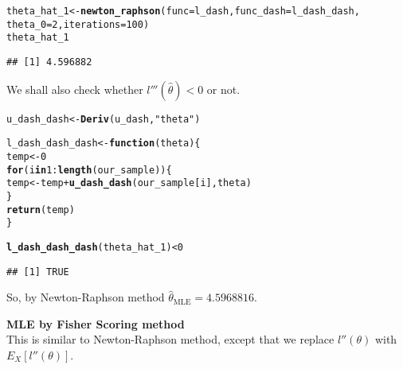 \documentclass[11pt, a4paper]{article}\usepackage[]{graphicx}\usepackage[]{xcolor}
\makeatletter
\newcommand{\hlnum}[1]{\textcolor[rgb]{0.686,0.059,0.569}{#1}}%
\newcommand{\hlsng}[1]{\textcolor[rgb]{0.192,0.494,0.8}{#1}}%
\newcommand{\hlopt}[1]{\textcolor[rgb]{0,0,0}{#1}}%
\newcommand{\hldef}[1]{\textcolor[rgb]{0.345,0.345,0.345}{#1}}%
\newcommand{\hlkwa}[1]{\textcolor[rgb]{0.161,0.373,0.58}{\textbf{#1}}}%
\newcommand{\hlkwb}[1]{\textcolor[rgb]{0.69,0.353,0.396}{#1}}%
\newcommand{\hlkwc}[1]{\textcolor[rgb]{0.333,0.667,0.333}{#1}}%
\newcommand{\hlkwd}[1]{\textcolor[rgb]{0.737,0.353,0.396}{\textbf{#1}}}%
\newenvironment{kframe}{%
 \def\at@end@of@kframe{}%
 \ifinner\ifhmode%
  \def\at@end@of@kframe{\end{minipage}}%
  \begin{minipage}{\columnwidth}%
 \fi\fi%
 \def\FrameCommand##1{\hskip\@totalleftmargin \hskip-\fboxsep
 \colorbox{shadecolor}{##1}\hskip-\fboxsep
     \hskip-\linewidth \hskip-\@totalleftmargin \hskip\columnwidth}%
 \MakeFramed {\advance\hsize-\width
   \@totalleftmargin\z@ \linewidth\hsize
   \@setminipage}}%
 {\par\unskip\endMakeFramed%
 \at@end@of@kframe}
\newenvironment{knitrout}{}{} %
\makeatother
\begin{document}
\begin{knitrout}
\color{fgcolor}\begin{kframe}
\begin{alltt}
\hldef{theta_hat_1} \hlkwb{<-} \hlkwd{newton_raphson}\hldef{(}\hlkwc{func} \hldef{= l_dash,} \hlkwc{func_dash} \hldef{= l_dash_dash,}
                              \hlkwc{theta_0} \hldef{=} \hlnum{2}\hldef{,} \hlkwc{iterations} \hldef{=} \hlnum{100}\hldef{)}
\hldef{theta_hat_1}
\end{alltt}
\begin{verbatim}
## [1] 4.596882
\end{verbatim}
\end{kframe}
\end{knitrout}

We shall also check whether $l'''(\hat{\theta}) < 0$ or not.

\begin{knitrout}
\color{fgcolor}\begin{kframe}
\begin{alltt}
\hldef{u_dash_dash} \hlkwb{<-} \hlkwd{Deriv}\hldef{(u_dash,} \hlsng{"theta"}\hldef{)}

\hldef{l_dash_dash_dash} \hlkwb{<-} \hlkwa{function}\hldef{(}\hlkwc{theta}\hldef{)\{}
  \hldef{temp} \hlkwb{<-} \hlnum{0}
  \hlkwa{for} \hldef{(i} \hlkwa{in} \hlnum{1}\hlopt{:}\hlkwd{length}\hldef{(our_sample)) \{}
    \hldef{temp} \hlkwb{<-} \hldef{temp} \hlopt{+} \hlkwd{u_dash_dash}\hldef{(our_sample[i], theta)}
  \hldef{\}}
  \hlkwd{return}\hldef{(temp)}
\hldef{\}}

\hlkwd{l_dash_dash_dash}\hldef{(theta_hat_1)} \hlopt{<} \hlnum{0}
\end{alltt}
\begin{verbatim}
## [1] TRUE
\end{verbatim}
\end{kframe}
\end{knitrout}

So, by Newton-Raphson method $\hat{\theta}_{\text{MLE}} = 4.5968816$. \\

\vspace{0.5cm}

\faArrowAltCircleRight[regular] \hspace{0.5cm} \textbf{MLE by Fisher Scoring method} \\

This is similar to Newton-Raphson method, except that we replace $l''(\theta)$ with $E_X[l''(\theta)]$. \\
\end{document}
